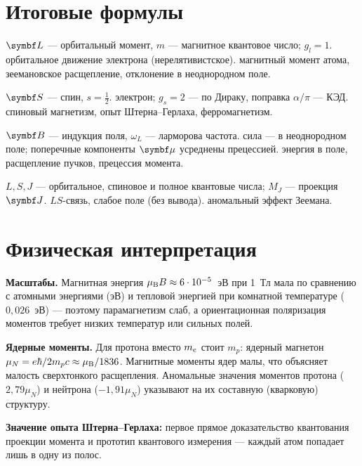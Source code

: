 \section{Итоговые формулы}

 {$\vect L$ — орбитальный момент, $m$ — магнитное квантовое число; $g_l=1$.}
 {орбитальное движение электрона (нерелятивистское).}
 {магнитный момент атома, зеемановское расщепление, отклонение в неоднородном поле.}

 {$\vect S$ — спин, $s=\frac12$.}
 {электрон; $g_s=2$ — по Дираку, поправка $\alpha/\pi$ — КЭД.}
 {спиновый магнетизм, опыт Штерна--Герлаха, ферромагнетизм.}

 {$\vect B$ — индукция поля, $\omega_L$ — ларморова частота.}
 {сила — в неоднородном поле; поперечные компоненты $\vect\mu$ усреднены прецессией.}
 {энергия в поле, расщепление пучков, прецессия момента.}

 {$L,S,J$ — орбитальное, спиновое и полное квантовые числа; $M_J$ — проекция $\vect J$.}
 {$LS$-связь, слабое поле (без вывода).}
 {аномальный эффект Зеемана.}

\section{Физическая интерпретация}

\textbf{Масштабы.} Магнитная энергия $\mu_{\mathrm B} B\approx6\cdot10^{-5}$~эВ при 1~Тл мала по сравнению с
атомными энергиями (эВ) и тепловой энергией при комнатной температуре ($0{,}026$~эВ) — поэтому
парамагнетизм слаб, а ориентационная поляризация моментов требует низких температур или сильных полей.

\textbf{Ядерные моменты.} Для протона вместо $m_e$ стоит $m_p$: ядерный магнетон $\mu_N=e\hbar/2m_pc\approx\mu_{\mathrm B}/1836$.
Магнитные моменты ядер малы, что объясняет малость сверхтонкого расщепления. Аномальные значения
моментов протона ($2{,}79\mu_N$) и нейтрона ($-1{,}91\mu_N$) указывают на их составную (кварковую) структуру.

\textbf{Значение опыта Штерна--Герлаха:} первое прямое доказательство квантования проекции момента и прототип
квантового измерения — каждый атом попадает лишь в одну из полос.


